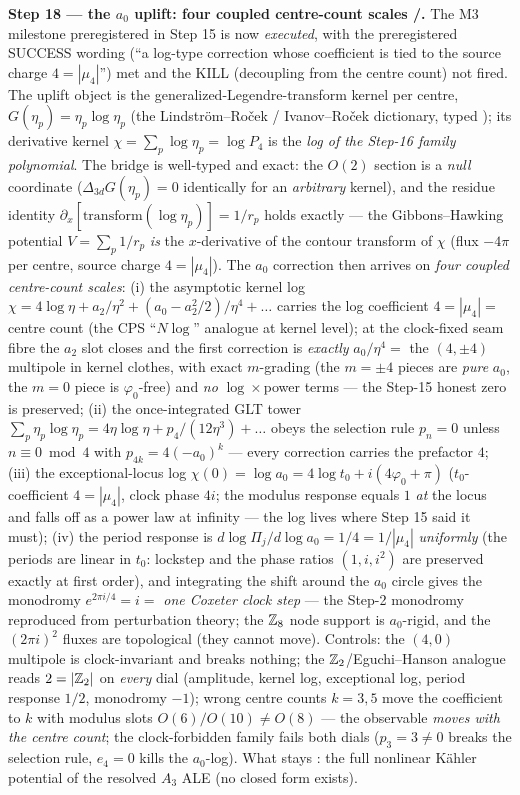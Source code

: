 \par\smallskip\noindent\textbf{Step 18 --- the $a_0$ uplift: four coupled centre-count scales
\mE/\mC.} The M3 milestone preregistered in Step 15 is now \emph{executed}, with the
preregistered SUCCESS wording (``a log-type correction whose coefficient is tied to the source
charge $4=|\mu_4|$'') met and the KILL (decoupling from the centre count) not fired. The uplift
object is the generalized-Legendre-transform kernel per centre, $G(\eta_p)=\eta_p\log\eta_p$
(the Lindstr\"om--Ro\v{c}ek / Ivanov--Ro\v{c}ek dictionary, typed \mC); its derivative kernel
$\chi=\sum_p\log\eta_p=\log P_4$ is the \emph{log of the Step-16 family polynomial}. The bridge
is well-typed and exact: the $O(2)$ section is a \emph{null} coordinate ($\Delta_{3d}G(\eta_p)=0$
identically for an \emph{arbitrary} kernel), and the residue identity
$\partial_x[\mathrm{transform}(\log\eta_p)]=1/r_p$ holds exactly --- the Gibbons--Hawking
potential $V=\sum_p1/r_p$ \emph{is} the $x$-derivative of the contour transform of $\chi$ (flux
$-4\pi$ per centre, source charge $4=|\mu_4|$). The $a_0$ correction then arrives on \emph{four
coupled centre-count scales}: (i) the asymptotic kernel log
$\chi=4\log\eta+a_2/\eta^2+(a_0-a_2^2/2)/\eta^4+\dots$ carries the log coefficient $4=|\mu_4|=$
centre count (the CPS ``$N\log$'' analogue at kernel level); at the clock-fixed seam fibre the
$a_2$ slot closes and the first correction is \emph{exactly} $a_0/\eta^4=$ the $(4,\pm4)$
multipole in kernel clothes, with exact $m$-grading (the $m=\pm4$ pieces are \emph{pure} $a_0$,
the $m=0$ piece is $\varphi_0$-free) and \emph{no} $\log\times$power terms --- the Step-15
honest zero is preserved; (ii) the once-integrated GLT tower $\sum_p\eta_p\log\eta_p=
4\eta\log\eta+p_4/(12\eta^3)+\dots$ obeys the selection rule $p_n=0$ unless $n\equiv0\bmod4$
with $p_{4k}=4(-a_0)^k$ --- every correction carries the prefactor $4$; (iii) the
exceptional-locus log $\chi(0)=\log a_0=4\log t_0+i(4\varphi_0+\pi)$ ($t_0$-coefficient
$4=|\mu_4|$, clock phase $4i$; the modulus response equals $1$ \emph{at} the locus and falls off
as a power law at infinity --- the log lives where Step 15 said it must); (iv) the period
response is $d\log\Pi_j/d\log a_0=1/4=1/|\mu_4|$ \emph{uniformly} (the periods are linear in
$t_0$: lockstep and the phase ratios $(1,i,i^2)$ are preserved exactly at first order), and
integrating the shift around the $a_0$ circle gives the monodromy $e^{2\pi i/4}=i=$ \emph{one
Coxeter clock step} --- the Step-2 monodromy reproduced from perturbation theory; the $\mathbb{Z}_8$
node support is $a_0$-rigid, and the $(2\pi i)^2$ fluxes are topological (they cannot move).
Controls: the $(4,0)$ multipole is clock-invariant and breaks nothing; the $\mathbb{Z}_2$/Eguchi--Hanson
analogue reads $2=|\mathbb{Z}_2|$ on \emph{every} dial (amplitude, kernel log, exceptional log, period
response $1/2$, monodromy $-1$); wrong centre counts $k=3,5$ move the coefficient to $k$ with
modulus slots $O(6)/O(10)\neq O(8)$ --- the observable \emph{moves with the centre count}; the
clock-forbidden family fails both dials ($p_3=3\neq0$ breaks the selection rule, $e_4=0$ kills
the $a_0$-log). What stays \mO: the full nonlinear K\"ahler potential of the resolved $A_3$ ALE
(no closed form exists).

